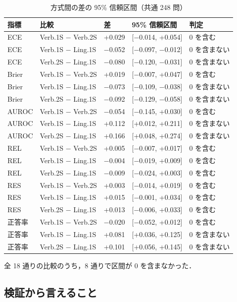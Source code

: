 \begin{table}[htbp]
\centering
\small
\caption{方式間の差の 95\% 信頼区間（共通 248 問）}
\label{tab:5.4}
\begin{tabular}{|l|l|l|l|l|}
\hline
指標 & 比較 & 差 & 95\% 信頼区間 & 判定 \\
\hline
ECE & Verb.1S − Verb.2S & +0.029 & [−0.014, +0.054] & 0 を含む \\
ECE & Verb.1S − Ling.1S & −0.052 & [−0.097, −0.012] & 0 を含まない \\
ECE & Verb.2S − Ling.1S & −0.080 & [−0.120, −0.031] & 0 を含まない \\
Brier & Verb.1S − Verb.2S & +0.019 & [−0.007, +0.047] & 0 を含む \\
Brier & Verb.1S − Ling.1S & −0.073 & [−0.109, −0.038] & 0 を含まない \\
Brier & Verb.2S − Ling.1S & −0.092 & [−0.129, −0.058] & 0 を含まない \\
AUROC & Verb.1S − Verb.2S & −0.054 & [−0.145, +0.030] & 0 を含む \\
AUROC & Verb.1S − Ling.1S & +0.112 & [+0.012, +0.211] & 0 を含まない \\
AUROC & Verb.2S − Ling.1S & +0.166 & [+0.048, +0.274] & 0 を含まない \\
REL & Verb.1S − Verb.2S & +0.005 & [−0.007, +0.017] & 0 を含む \\
REL & Verb.1S − Ling.1S & −0.004 & [−0.019, +0.009] & 0 を含む \\
REL & Verb.2S − Ling.1S & −0.009 & [−0.024, +0.003] & 0 を含む \\
RES & Verb.1S − Verb.2S & +0.003 & [−0.014, +0.019] & 0 を含む \\
RES & Verb.1S − Ling.1S & +0.015 & [−0.001, +0.034] & 0 を含む \\
RES & Verb.2S − Ling.1S & +0.013 & [−0.006, +0.033] & 0 を含む \\
正答率 & Verb.1S − Verb.2S & −0.020 & [−0.052, +0.012] & 0 を含む \\
正答率 & Verb.1S − Ling.1S & +0.081 & [+0.036, +0.125] & 0 を含まない \\
正答率 & Verb.2S − Ling.1S & +0.101 & [+0.056, +0.145] & 0 を含まない \\
\hline
\end{tabular}
\end{table}

全 18 通りの比較のうち，8 通りで区間が 0 を含まなかった．

\subsection{検証から言えること}

